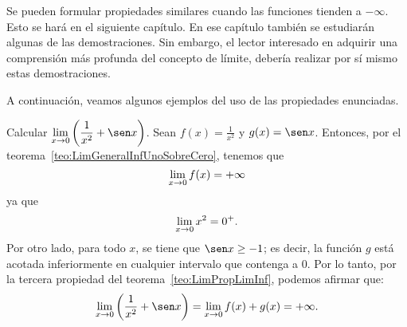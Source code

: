 Se pueden formular propiedades similares cuando las funciones tienden a $-\infty$. Esto se hará en
el siguiente capítulo. En ese capítulo también se estudiarán algunas de las demostraciones. Sin
embargo, el lector interesado en adquirir una comprensión más profunda del concepto de límite,
debería realizar por sí mismo estas demostraciones.

A continuación, veamos algunos ejemplos del uso de las propiedades enunciadas.

\begin{exemplo}[Solución]{%
Calcular $\displaystyle\limjc{\left(\frac{1}{x^2} + \sen x\right)}{x}{0}$.}%
Sean $f(x) = \displaystyle \frac{1}{x^2}$ y $g(x) = \sen x$. Entonces, por el
teorema~\ref{teo:LimGeneralInfUnoSobreCero}, tenemos que
\[
\limjc{f(x)}{x}{0} = +\infty
\]
ya que
\[
\limjc{x^2}{x}{0} = 0^+.
\]
Por otro lado, para todo $x$, se tiene que $\sen x \geq -1$; es decir, la función $g$ está acotada
inferiormente en cualquier intervalo que contenga a $0$. Por lo tanto, por la tercera propiedad del
teorema~\ref{teo:LimPropLimInf}, podemos afirmar que:
\[
\limjc{\left(\frac{1}{x^2} + \sen x\right)}{x}{0} = \limjc{f(x) + g(x)}{x}{0} = +\infty.
\]
\end{exemplo}

